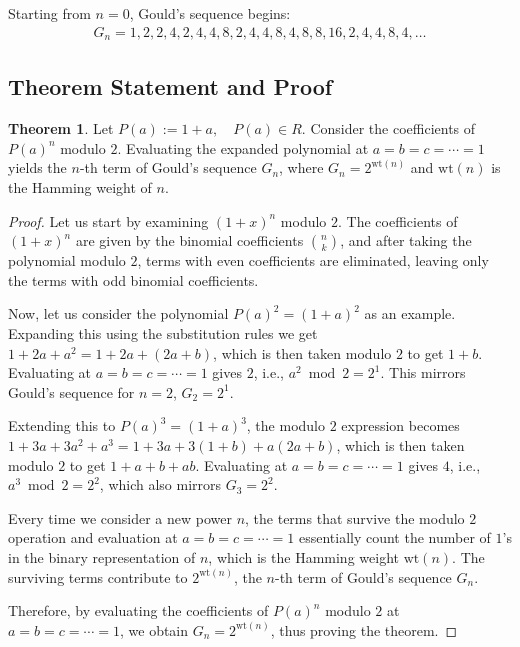 \documentclass{article}
\theoremstyle{plain}
\theoremstyle{definition}
\newtheorem{thm}{Theorem}
\begin{document}
Starting from $n=0$, Gould's sequence begins:
\begin{align}
    G_n = 1, 2, 2, 4, 2, 4, 4, 8, 2, 4, 4, 8, 4, 8, 8, 16, 2, 4, 4, 8, 4, \ldots
\end{align}

\subsection{Theorem Statement and Proof}
\begin{thm}
\label{thm:2}
    Let \( P(a) := 1+a, \quad P(a) \in R\). Consider the coefficients of \(P(a)^n\) modulo \(2\). Evaluating the expanded polynomial at \( a=b=c=\cdots=1 \) yields the \(n\)-th term of Gould's sequence \(G_n\), where \( G_n = 2^{\text{wt}(n)} \) and \( \text{wt}(n) \) is the Hamming weight of \( n \).
\end{thm}

\begin{proof}
Let us start by examining \( (1+x)^n \) modulo \( 2 \). The coefficients of \( (1+x)^n \) are given by the binomial coefficients \(\binom{n}{k}\), and after taking the polynomial modulo \( 2 \), terms with even coefficients are eliminated, leaving only the terms with odd binomial coefficients.

Now, let us consider the polynomial \( P(a)^2 = (1+a)^2 \) as an example. Expanding this using the substitution rules we get \( 1 + 2a + a^2 = 1 + 2a + (2a + b) \), which is then taken modulo \( 2 \) to get \( 1 + b \). Evaluating at \( a=b=c=\cdots=1 \) gives \( 2 \), i.e., \( a^{2} \bmod 2 = 2^1 \). This mirrors Gould's sequence for \( n = 2 \), \( G_2 = 2^1 \).

Extending this to \( P(a)^3 = (1+a)^3 \), the modulo \( 2 \) expression becomes \(1 + 3a + 3a^2 + a^3 = 1 + 3a + 3(1+b) + a(2a+b) \), which is then taken modulo \( 2 \) to get \( 1 + a + b + ab \). Evaluating at \( a=b=c=\cdots=1 \) gives \( 4 \), i.e., \( a^{3} \bmod 2 = 2^2 \), which also mirrors \( G_3 = 2^2 \).

Every time we consider a new power \( n \), the terms that survive the modulo \( 2 \) operation and evaluation at \( a=b=c=\cdots=1 \) essentially count the number of \( 1 \)'s in the binary representation of \( n \), which is the Hamming weight \(\text{wt}(n)\). The surviving terms contribute to \( 2^{\text{wt}(n)} \), the \( n \)-th term of Gould's sequence \( G_n \).

Therefore, by evaluating the coefficients of \( P(a)^n \) modulo \( 2 \) at \( a=b=c=\cdots=1 \), we obtain \( G_n = 2^{\text{wt}(n)} \), thus proving the theorem.
\end{proof}
\end{document}
